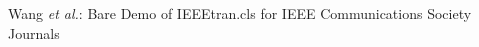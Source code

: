 \documentclass[journal,comsoc]{IEEEtran}
\begin{document}
%



%
{Wang \MakeLowercase{\textit{et al.}}: Bare Demo of IEEEtran.cls for IEEE Communications Society Journals}
% 






\maketitle
\end{document}
